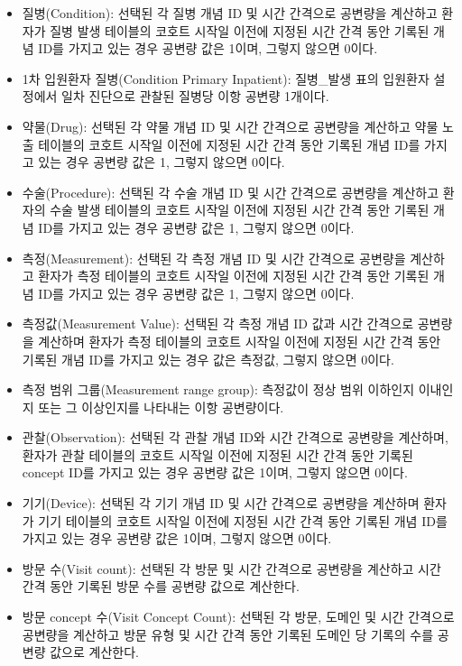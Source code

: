 \documentclass[11pt]{book}
\providecommand{\tightlist}{%
  \setlength{\itemsep}{0pt}\setlength{\parskip}{0pt}}
\theoremstyle{definition}
\theoremstyle{definition}
\theoremstyle{definition}
\theoremstyle{remark}
\begin{document}
\begin{itemize}
\tightlist
\item
  질병(Condition): 선택된 각 질병 개념 ID 및 시간 간격으로 공변량을
  계산하고 환자가 질병 발생 테이블의 코호트 시작일 이전에 지정된 시간
  간격 동안 기록된 개념 ID를 가지고 있는 경우 공변량 값은 1이며, 그렇지
  않으면 0이다.
\item
  1차 입원환자 질병(Condition Primary Inpatient): 질병\_발생 표의
  입원환자 설정에서 일차 진단으로 관찰된 질병당 이항 공변량 1개이다.
\item
  약물(Drug): 선택된 각 약물 개념 ID 및 시간 간격으로 공변량을 계산하고
  약물 노출 테이블의 코호트 시작일 이전에 지정된 시간 간격 동안 기록된
  개념 ID를 가지고 있는 경우 공변량 값은 1, 그렇지 않으면 0이다.
\item
  수술(Procedure): 선택된 각 수술 개념 ID 및 시간 간격으로 공변량을
  계산하고 환자의 수술 발생 테이블의 코호트 시작일 이전에 지정된 시간
  간격 동안 기록된 개념 ID를 가지고 있는 경우 공변량 값은 1, 그렇지
  않으면 0이다.
\item
  측정(Measurement): 선택된 각 측정 개념 ID 및 시간 간격으로 공변량을
  계산하고 환자가 측정 테이블의 코호트 시작일 이전에 지정된 시간 간격
  동안 기록된 개념 ID를 가지고 있는 경우 공변량 값은 1, 그렇지 않으면
  0이다.
\item
  측정값(Measurement Value): 선택된 각 측정 개념 ID 값과 시간 간격으로
  공변량을 계산하며 환자가 측정 테이블의 코호트 시작일 이전에 지정된
  시간 간격 동안 기록된 개념 ID를 가지고 있는 경우 값은 측정값, 그렇지
  않으면 0이다.
\item
  측정 범위 그룹(Measurement range group): 측정값이 정상 범위 이하인지
  이내인지 또는 그 이상인지를 나타내는 이항 공변량이다.
\item
  관찰(Observation): 선택된 각 관찰 개념 ID와 시간 간격으로 공변량을
  계산하며, 환자가 관찰 테이블의 코호트 시작일 이전에 지정된 시간 간격
  동안 기록된 concept ID를 가지고 있는 경우 공변량 값은 1이며, 그렇지
  않으면 0이다.
\item
  기기(Device): 선택된 각 기기 개념 ID 및 시간 간격으로 공변량을
  계산하며 환자가 기기 테이블의 코호트 시작일 이전에 지정된 시간 간격
  동안 기록된 개념 ID를 가지고 있는 경우 공변량 값은 1이며, 그렇지
  않으면 0이다.
\item
  방문 수(Visit count): 선택된 각 방문 및 시간 간격으로 공변량을
  계산하고 시간 간격 동안 기록된 방문 수를 공변량 값으로 계산한다.
\item
  방문 concept 수(Visit Concept Count): 선택된 각 방문, 도메인 및 시간
  간격으로 공변량을 계산하고 방문 유형 및 시간 간격 동안 기록된 도메인
  당 기록의 수를 공변량 값으로 계산한다.
\end{itemize}
\end{document}
